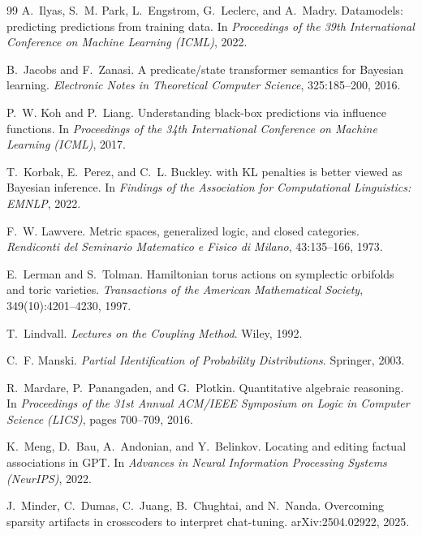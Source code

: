 \documentclass[11pt]{article}
\theoremstyle{definition}
\theoremstyle{remark}
\begin{document}
\begin{thebibliography}{99}
A.~Ilyas, S.~M. Park, L.~Engstrom, G.~Leclerc, and A.~Madry.
\newblock Datamodels: predicting predictions from training data.
\newblock In \emph{Proceedings of the 39th International Conference on Machine Learning (ICML)}, 2022.

B.~Jacobs and F.~Zanasi.
\newblock A predicate/state transformer semantics for {B}ayesian learning.
\newblock \emph{Electronic Notes in Theoretical Computer Science}, 325:185--200, 2016.

P.~W. Koh and P.~Liang.
\newblock Understanding black-box predictions via influence functions.
\newblock In \emph{Proceedings of the 34th International Conference on Machine Learning (ICML)}, 2017.

T.~Korbak, E.~Perez, and C.~L. Buckley.
 with {KL} penalties is better viewed as {B}ayesian inference.
\newblock In \emph{Findings of the Association for Computational Linguistics: EMNLP}, 2022.

F.~W. Lawvere.
\newblock Metric spaces, generalized logic, and closed categories.
\newblock \emph{Rendiconti del Seminario Matematico e Fisico di Milano}, 43:135--166, 1973.

E.~Lerman and S.~Tolman.
\newblock Hamiltonian torus actions on symplectic orbifolds and toric varieties.
\newblock \emph{Transactions of the American Mathematical Society}, 349(10):4201--4230, 1997.

T.~Lindvall.
\newblock \emph{Lectures on the Coupling Method}.
\newblock Wiley, 1992.

C.~F. Manski.
\newblock \emph{Partial Identification of Probability Distributions}.
\newblock Springer, 2003.

R.~Mardare, P.~Panangaden, and G.~Plotkin.
\newblock Quantitative algebraic reasoning.
\newblock In \emph{Proceedings of the 31st Annual ACM/IEEE Symposium on Logic in Computer Science
  (LICS)}, pages 700--709, 2016.

K.~Meng, D.~Bau, A.~Andonian, and Y.~Belinkov.
\newblock Locating and editing factual associations in {GPT}.
\newblock In \emph{Advances in Neural Information Processing Systems (NeurIPS)}, 2022.

J.~Minder, C.~Dumas, C.~Juang, B.~Chughtai, and N.~Nanda.
\newblock Overcoming sparsity artifacts in crosscoders to interpret chat-tuning.
\newblock arXiv:2504.02922, 2025.


\end{thebibliography}
\end{document}
